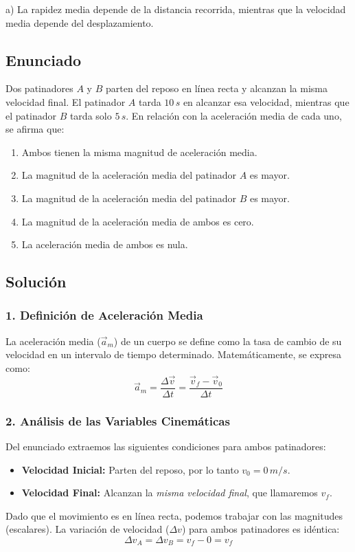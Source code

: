 \documentclass[12pt, a4paper]{article}
\begin{document}
\begin{tcolorbox}[colback=green!5!white, colframe=green!50!black, title=Respuesta Final]
\centering \Large a) La rapidez media depende de la distancia recorrida, mientras que la velocidad media depende del desplazamiento.
\end{tcolorbox}

\newpage

\subsection*{Enunciado}
Dos patinadores $A$ y $B$ parten del reposo en línea recta y alcanzan la misma velocidad final. El patinador $A$ tarda $10 \, \si{s}$ en alcanzar esa velocidad, mientras que el patinador $B$ tarda solo $5 \, \si{s}$. En relación con la aceleración media de cada uno, se afirma que:

\begin{enumerate}[label=\alph*)]
    \item Ambos tienen la misma magnitud de aceleración media.
    \item La magnitud de la aceleración media del patinador $A$ es mayor.
    \item La magnitud de la aceleración media del patinador $B$ es mayor.
    \item La magnitud de la aceleración media de ambos es cero.
    \item La aceleración media de ambos es nula.
\end{enumerate}

\subsection*{Solución}

\subsubsection*{1. Definición de Aceleración Media}
La aceleración media ($\vec{a}_m$) de un cuerpo se define como la tasa de cambio de su velocidad en un intervalo de tiempo determinado. Matemáticamente, se expresa como:
$$ \vec{a}_m = \frac{\Delta\vec{v}}{\Delta t} = \frac{\vec{v}_f - \vec{v}_0}{\Delta t} $$

\subsubsection*{2. Análisis de las Variables Cinemáticas}
Del enunciado extraemos las siguientes condiciones para ambos patinadores:
\begin{itemize}
    \item \textbf{Velocidad Inicial:} Parten del reposo, por lo tanto $v_0 = 0 \, \si{m/s}$.
    \item \textbf{Velocidad Final:} Alcanzan la \textit{misma velocidad final}, que llamaremos $v_f$.
\end{itemize}
Dado que el movimiento es en línea recta, podemos trabajar con las magnitudes (escalares). La variación de velocidad ($\Delta v$) para ambos patinadores es idéntica:
$$ \Delta v_A = \Delta v_B = v_f - 0 = v_f $$
\end{document}
